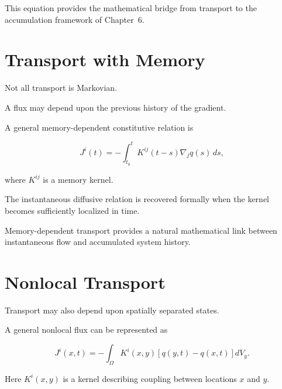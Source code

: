 \documentclass[12pt,oneside]{book}
\begin{document}
This equation provides the mathematical bridge from transport to
the accumulation framework of Chapter~6.


\section{Transport with Memory}
\label{sec:transport-memory}

Not all transport is Markovian.

A flux may depend upon the previous history of the gradient.

A general memory-dependent constitutive relation is

\begin{equation}
    J^i(t)
    =
    -
    \int_{t_0}^{t}
        K^{ij}(t-s)
        \nabla_j q(s)
    \,ds,
    \label{eq:transport-memory-kernel}
\end{equation}

where \(K^{ij}\) is a memory kernel.

The instantaneous diffusive relation is recovered formally when
the kernel becomes sufficiently localized in time.

Memory-dependent transport provides a natural mathematical link
between instantaneous flow and accumulated system history.


\section{Nonlocal Transport}
\label{sec:nonlocal-transport}

Transport may also depend upon spatially separated states.

A general nonlocal flux can be represented as

\begin{equation}
    J^i(x,t)
    =
    -
    \int_{\Omega}
        K^i(x,y)
        \left[
            q(y,t)-q(x,t)
        \right]
    dV_y.
    \label{eq:nonlocal-flux}
\end{equation}

Here \(K^i(x,y)\) is a kernel describing coupling between
locations \(x\) and \(y\).
\end{document}

